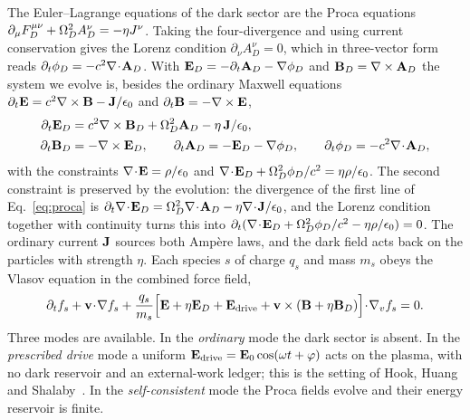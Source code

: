 The Euler--Lagrange equations of the dark sector are the Proca equations $\partial_\mu F_D^{\mu\nu}+\Omega_D^2A_D^\nu=-\eta J^\nu$. Taking the four-divergence and using current conservation gives the Lorenz condition $\partial_\nu A_D^\nu=0$, which in three-vector form reads $\partial_t\phi_D=-c^2\nabla\!\cdot\!\mathbf{A}_D$. With $\mathbf{E}_D=-\partial_t\mathbf{A}_D-\nabla\phi_D$ and $\mathbf{B}_D=\nabla\times\mathbf{A}_D$ the system we evolve is, besides the ordinary Maxwell equations $\partial_t\mathbf{E}=c^2\nabla\times\mathbf{B}-\mathbf{J}/\epsilon_0$ and $\partial_t\mathbf{B}=-\nabla\times\mathbf{E}$,
\begin{align}
\partial_t\mathbf{E}_D&=c^2\nabla\times\mathbf{B}_D+\Omega_D^2\mathbf{A}_D-\eta\,\mathbf{J}/\epsilon_0,\nonumber\\
\partial_t\mathbf{B}_D&=-\nabla\times\mathbf{E}_D,\qquad
\partial_t\mathbf{A}_D=-\mathbf{E}_D-\nabla\phi_D,\qquad
\partial_t\phi_D=-c^2\nabla\!\cdot\!\mathbf{A}_D ,
\label{eq:proca}
\end{align}
with the constraints $\nabla\!\cdot\!\mathbf{E}=\rho/\epsilon_0$ and $\nabla\!\cdot\!\mathbf{E}_D+\Omega_D^2\phi_D/c^2=\eta\rho/\epsilon_0$. The second constraint is preserved by the evolution: the divergence of the first line of Eq.~\eqref{eq:proca} is $\partial_t\nabla\!\cdot\!\mathbf{E}_D=\Omega_D^2\nabla\!\cdot\!\mathbf{A}_D-\eta\nabla\!\cdot\!\mathbf{J}/\epsilon_0$, and the Lorenz condition together with continuity turns this into $\partial_t(\nabla\!\cdot\!\mathbf{E}_D+\Omega_D^2\phi_D/c^2-\eta\rho/\epsilon_0)=0$. The ordinary current $\mathbf{J}$ sources both Ampère laws, and the dark field acts back on the particles with strength $\eta$. Each species $s$ of charge $q_s$ and mass $m_s$ obeys the Vlasov equation in the combined force field,
\begin{equation}
\partial_tf_s+\mathbf{v}\!\cdot\!\nabla f_s+\frac{q_s}{m_s}\Big[\mathbf{E}+\eta\mathbf{E}_D+\mathbf{E}_{\rm drive}+\mathbf{v}\times(\mathbf{B}+\eta\mathbf{B}_D)\Big]\!\cdot\!\nabla_vf_s=0 .
\label{eq:vlasov}
\end{equation}
Three modes are available. In the \emph{ordinary} mode the dark sector is absent. In the \emph{prescribed drive} mode a uniform $\mathbf{E}_{\rm drive}=\mathbf{E}_0\cos(\omega t+\varphi)$ acts on the plasma, with no dark reservoir and an external-work ledger; this is the setting of Hook, Huang and Shalaby~\cite{HHS2026}. In the \emph{self-consistent} mode the Proca fields evolve and their energy reservoir is finite.

